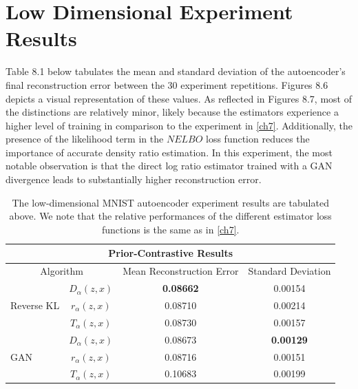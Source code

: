 \documentclass[honours,12pt, twoside]{unswthesis}
\numberwithin{equation}{section}
\theoremstyle{definition}
\begin{document}
\section{Low Dimensional Experiment Results}
Table 8.1 below tabulates the mean and standard deviation of the autoencoder's final reconstruction error between the 30 experiment repetitions. Figures 8.6 depicts a visual representation of these values. As reflected in Figures 8.7, most of the distinctions are relatively minor, likely because the estimators experience a higher level of training in comparison to the experiment in \autoref{ch7}. Additionally, the presence of the likelihood term in the $NELBO$ loss function reduces the importance of accurate density ratio estimation. In this experiment, the most notable observation is that the direct log ratio estimator trained with a GAN divergence leads to substantially higher reconstruction error.  
\begin{table}[h]
\centering
\begin{tabular}{|l|c|c|c|}
\hline
\multicolumn{4}{|c|}{Prior-Contrastive Results}\\
\hline
\multicolumn{2}{|c|}{Algorithm} & Mean Reconstruction Error & Standard Deviation\\
\hline
\multirow{3}{*}{Reverse KL} & $D_\alpha(z,x)$ & \textbf{0.08662} & 0.00154\\
\cline{2-4}
& $r_\alpha(z,x)$ & 0.08710 & 0.00214\\
\cline{2-4}
& $T_\alpha(z,x)$ & 0.08730 & 0.00157\\
\hline
\multirow{3}{*}{GAN} & $D_\alpha(z,x)$ & 0.08673 & \textbf{0.00129}\\
\cline{2-4}
& $r_\alpha(z,x)$ & 0.08716 & 0.00151\\
\cline{2-4}
& $T_\alpha(z,x)$ & 0.10683 & 0.00199\\
\hline
\end{tabular}
\caption{\small The low-dimensional MNIST autoencoder experiment results are tabulated above. We note that the relative performances of the different estimator loss functions is the same as in \autoref{ch7}.}
\end{table}
\end{document}
